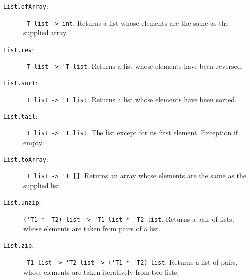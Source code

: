 \begin{description}
\item[\texttt{List.ofArray}:] \lstinline{'T list -> int}. Returns a list whose elements are the same as the supplied array.
\item[\texttt{List.rev}:] \lstinline{'T list -> 'T list}. Returns a list whose elements have been reversed.
\item[\texttt{List.sort}:] \lstinline{'T list -> 'T list}. Returns a list whose elements have been sorted.
\item[\texttt{List.tail}:]  \lstinline{'T list -> 'T list}. The list except for its first element. Exception if empty.
\item[\texttt{List.toArray}:] \lstinline{'T list -> 'T []}. Returns an array whose elements are the same as the supplied list.
\item[\texttt{List.unzip}:] \lstinline{('T1 * 'T2) list -> 'T1 list * 'T2 list}. Returns a pair of lists, whose elements are taken from pairs of a list.
\item[\texttt{List.zip}:] \lstinline{'T1 list -> 'T2 list -> ('T1 * 'T2) list}. Returns a list of pairs, whose elements are taken iteratively from two lists.
\end{description}

